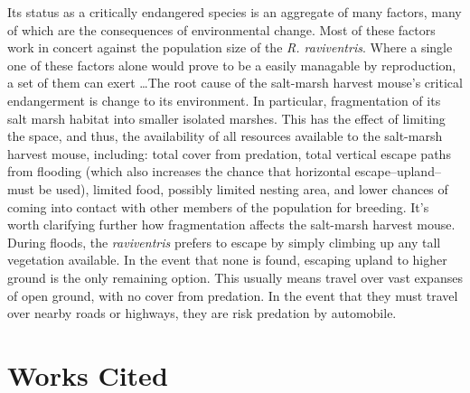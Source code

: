 \documentclass[a4paper]{article}
\begin{document}
Its status as a critically endangered species is an aggregate of many factors, many of which are the consequences of environmental change. Most of these factors work in concert against the population size of the \textit{R. raviventris}. Where a single one of these factors alone would prove to be a easily managable by reproduction, a set of them can exert \ldots The root cause of the salt-marsh harvest mouse's critical endangerment is change to its environment. In particular, fragmentation of its salt marsh habitat into smaller isolated marshes. This has the effect of limiting the space, and thus, the availability of all resources available to the salt-marsh harvest mouse, including: total cover from predation, total vertical escape paths from flooding (which also increases the chance that horizontal escape--upland--must be used), limited food, possibly limited nesting area, and lower chances of coming into contact with other members of the population for breeding. It's worth clarifying further how fragmentation affects the salt-marsh  harvest mouse. During floods, the \textit{raviventris} prefers to escape by simply climbing up any tall vegetation available. In the event that none is found, escaping upland to higher ground is the only remaining option. This usually means travel over vast expanses of open ground, with no cover from predation. In the event that they must travel over nearby roads or highways, they are risk predation by automobile.



\section{Works Cited}
\end{document}
